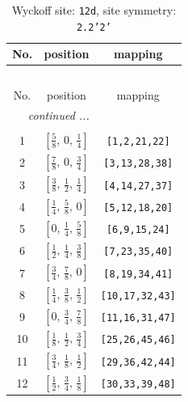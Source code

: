 \documentclass[fleqn,8pt]{jsarticle}
\begin{document}
\begin{longtable}{ccc}
\caption{Wyckoff site: {\tt 12d}, site symmetry: {\tt 2.2'2'}}
 \\
 \hline \hline
No. & position & mapping \\ \hline \endfirsthead

\multicolumn{2}{l}{\tablename\ \thetable{}} \\
 \hline \hline
No. & position & mapping \\ \hline \endhead

 \hline \hline
\multicolumn{2}{r}{\footnotesize\it continued ...} \\ \endfoot

 \hline \hline
\multicolumn{2}{r}{} \\ \endlastfoot

1 & $\left[ \frac{5}{8},\, 0,\, \frac{1}{4} \right]$ & {\tt [1,2,21,22]} \\ \hline
2 & $\left[ \frac{7}{8},\, 0,\, \frac{3}{4} \right]$ & {\tt [3,13,28,38]} \\ \hline
3 & $\left[ \frac{3}{8},\, \frac{1}{2},\, \frac{1}{4} \right]$ & {\tt [4,14,27,37]} \\ \hline
4 & $\left[ \frac{1}{4},\, \frac{5}{8},\, 0 \right]$ & {\tt [5,12,18,20]} \\ \hline
5 & $\left[ 0,\, \frac{1}{4},\, \frac{5}{8} \right]$ & {\tt [6,9,15,24]} \\ \hline
6 & $\left[ \frac{1}{2},\, \frac{1}{4},\, \frac{3}{8} \right]$ & {\tt [7,23,35,40]} \\ \hline
7 & $\left[ \frac{3}{4},\, \frac{7}{8},\, 0 \right]$ & {\tt [8,19,34,41]} \\ \hline
8 & $\left[ \frac{1}{4},\, \frac{3}{8},\, \frac{1}{2} \right]$ & {\tt [10,17,32,43]} \\ \hline
9 & $\left[ 0,\, \frac{3}{4},\, \frac{7}{8} \right]$ & {\tt [11,16,31,47]} \\ \hline
10 & $\left[ \frac{1}{8},\, \frac{1}{2},\, \frac{3}{4} \right]$ & {\tt [25,26,45,46]} \\ \hline
11 & $\left[ \frac{3}{4},\, \frac{1}{8},\, \frac{1}{2} \right]$ & {\tt [29,36,42,44]} \\ \hline
12 & $\left[ \frac{1}{2},\, \frac{3}{4},\, \frac{1}{8} \right]$ & {\tt [30,33,39,48]} \\
\end{longtable}
\renewcommand{\arraystretch}{1.2}
\end{document}
